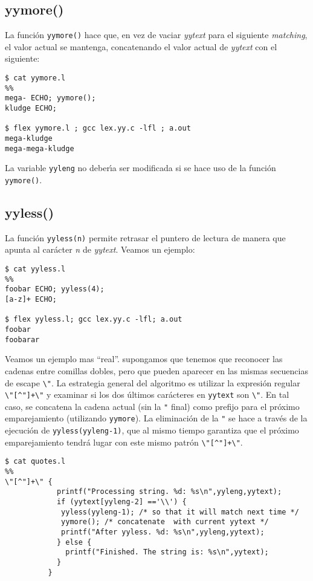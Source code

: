 \subsection{yymore()}
La funci\'on \verb|yymore()| hace que, en vez de vaciar \emph{yytext}
para el siguiente \emph{matching}, el valor actual se mantenga,
concatenando el valor actual de \emph{yytext} con el siguiente:
\begin{verbatim}
$ cat yymore.l
%%
mega- ECHO; yymore();
kludge ECHO;
 
$ flex yymore.l ; gcc lex.yy.c -lfl ; a.out
mega-kludge
mega-mega-kludge             
\end{verbatim}
La variable \verb|yyleng| no deber\'{\i}a ser modificada si se hace uso de la
funci\'on \verb|yymore()|.

\subsection{yyless()}
La funci\'on \verb|yyless(n)| permite retrasar el puntero de lectura  
de manera que apunta al car\'acter \emph{n} de \emph{yytext}. 
Veamos un ejemplo:
\begin{verbatim}
$ cat yyless.l
%%
foobar ECHO; yyless(4);
[a-z]+ ECHO;
 
$ flex yyless.l; gcc lex.yy.c -lfl; a.out
foobar
foobarar                                   
\end{verbatim}
Veamos un ejemplo mas ``real''. supongamos que tenemos que reconocer 
las cadenas entre comillas dobles, pero que pueden aparecer en las
mismas secuencias de escape \verb|\"|. La estrategia general del algoritmo
es utilizar la expresión regular \verb|\"[^"]+\"| y examinar si
los dos últimos  carácteres en \verb|yytext| son \verb|\"|. En tal caso, 
se concatena la cadena actual (sin la \verb|"| final) como prefijo para
el próximo emparejamiento (utilizando \verb|yymore|). 
La eliminación de la \verb|"| se hace a través de la ejecución de 
\verb|yyless(yyleng-1)|, que al mismo tiempo garantiza que el próximo emparejamiento 
tendrá lugar con este mismo patrón \verb|\"[^"]+\"|.
\begin{verbatim}
$ cat quotes.l
%%
\"[^"]+\" {
            printf("Processing string. %d: %s\n",yyleng,yytext);
            if (yytext[yyleng-2] =='\\') {
             yyless(yyleng-1); /* so that it will match next time */
             yymore(); /* concatenate  with current yytext */
             printf("After yyless. %d: %s\n",yyleng,yytext);
            } else {
              printf("Finished. The string is: %s\n",yytext);
            }
          }                    
\end{verbatim}
